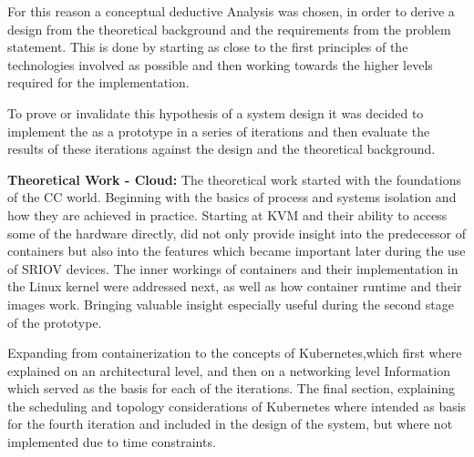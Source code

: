 For this reason a conceptual deductive Analysis was chosen, in order
to derive a design from the theoretical background and the requirements from the problem statement.
This is done by starting as close to the first principles of the
technologies involved as possible and then working towards the higher levels required for the implementation.

To prove or invalidate this hypothesis of a system design it was
decided to implement the as a prototype in a series of iterations and
then evaluate the results of these iterations against the design and the theoretical background. \



\pagebreak


\textbf{Theoretical Work - Cloud:} The theoretical work started with the foundations of the \ac{CC} world.
Beginning with the basics of process and systems isolation and how they are achieved in practice.
Starting at \ac{KVM} and their ability to access some of the hardware directly,
did not only provide insight into the predecessor of containers but also into the features
which became important later during the use of \ac{SRIOV} devices.
The inner workings of containers and their implementation in the Linux kernel were addressed next,
as well as how container runtime and their images work.
Bringing valuable insight especially useful during the second stage of the prototype.


Expanding from containerization to the concepts of Kubernetes,which first where explained on an architectural level,
and then on a networking level Information which served as the basis for each of the iterations.
The final section, explaining the scheduling and topology considerations of Kubernetes where intended as basis
for the fourth iteration and included in the design of the system, but where not implemented due to time constraints.

